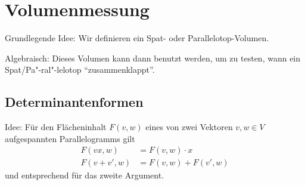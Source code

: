 \chapter{Volumenmessung}
Grundlegende Idee: Wir definieren ein Spat- oder Parallelotop-Volumen.

Algebraisch: Dieses Volumen kann dann benutzt werden, um zu testen, wann ein Spat/Pa"-ral"-lelotop "`zusammenklappt"'.
\section{Determinantenformen}
 Idee: Für den Flächeninhalt $ F(v,w) $ eines von zwei Vektoren $ v,w\in V $ aufgespannten Parallelogramms gilt
 \begin{align*}
 	F{(vx,w)} & = F{(v,w)}\cdot x \\
 	F(v+v',w) & = F(v,w)+F(v',w)
 \end{align*}
 und entsprechend für das zweite Argument.


